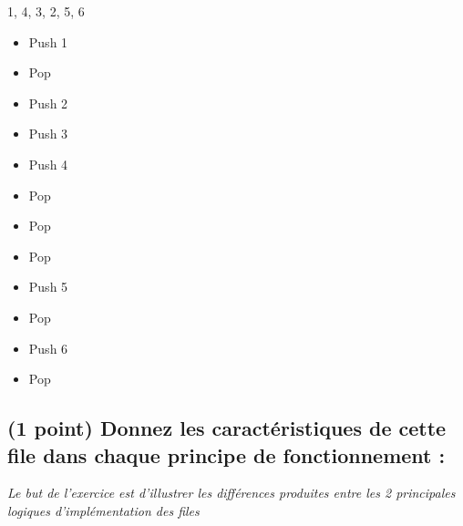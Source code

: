 \documentclass[11pt,a4paper]{article}
\begin{document}
\begin{center}
\begin{table}[ht!]
\begin{minipage}{0.33\textwidth}
\begin{center}
\end{center}

  \end{minipage}
  \hfillx
  \begin{minipage}{0.33\textwidth}

\begin{center}
\begin{large}
1, 4, 3, 2, 5, 6
\end{large}

\medskip

\begin{itemize}
\item Push 1
\item Pop
\item Push 2
\item Push 3
\item Push 4
\item Pop
\item Pop
\item Pop
\item Push 5
\item Pop
\item Push 6
\item Pop
\end{itemize}

\end{center}

  \end{minipage}
\end{table}
\end{center}



\vfillLast

\clearpage


\subsection{(1 point) Donnez les caractéristiques de cette file dans chaque principe de fonctionnement : }

\begin{center}
\textit{Le but de l'exercice est d'illustrer les différences produites entre les 2 principales logiques d'implémentation des files}
\end{center}

\end{document}

